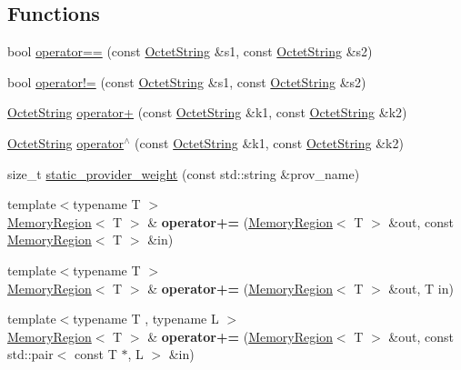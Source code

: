 \subsection*{Functions}
\begin{DoxyCompactItemize}
\item 
bool \hyperlink{namespaceBotan_ada334debcefe679cd86ea5515fdac333}{operator==} (const \hyperlink{classBotan_1_1OctetString}{Octet\-String} \&s1, const \hyperlink{classBotan_1_1OctetString}{Octet\-String} \&s2)
\item 
bool \hyperlink{namespaceBotan_a9ddf36ed7be5a5e216c0f14fd77ff1a6}{operator!=} (const \hyperlink{classBotan_1_1OctetString}{Octet\-String} \&s1, const \hyperlink{classBotan_1_1OctetString}{Octet\-String} \&s2)
\item 
\hyperlink{classBotan_1_1OctetString}{Octet\-String} \hyperlink{namespaceBotan_a41e34bf15722c5c4e07110340711e719}{operator+} (const \hyperlink{classBotan_1_1OctetString}{Octet\-String} \&k1, const \hyperlink{classBotan_1_1OctetString}{Octet\-String} \&k2)
\item 
\hyperlink{classBotan_1_1OctetString}{Octet\-String} \hyperlink{namespaceBotan_acae3b6bb409aed05ab658d9aa9a70b3e}{operator$^\wedge$} (const \hyperlink{classBotan_1_1OctetString}{Octet\-String} \&k1, const \hyperlink{classBotan_1_1OctetString}{Octet\-String} \&k2)
\item 
size\-\_\-t \hyperlink{namespaceBotan_afaf81ba31997b36ea0928e297e03ea47}{static\-\_\-provider\-\_\-weight} (const std\-::string \&prov\-\_\-name)
\item 
\hypertarget{namespaceBotan_a6eb7458a1c5c8ba5f37e7a145e3fa8d0}{{\footnotesize template$<$typename T $>$ }\\\hyperlink{classBotan_1_1MemoryRegion}{Memory\-Region}$<$ T $>$ \& {\bfseries operator+=} (\hyperlink{classBotan_1_1MemoryRegion}{Memory\-Region}$<$ T $>$ \&out, const \hyperlink{classBotan_1_1MemoryRegion}{Memory\-Region}$<$ T $>$ \&in)}\label{namespaceBotan_a6eb7458a1c5c8ba5f37e7a145e3fa8d0}

\item 
\hypertarget{namespaceBotan_a5f09c231a254046ad51ad80998842b83}{{\footnotesize template$<$typename T $>$ }\\\hyperlink{classBotan_1_1MemoryRegion}{Memory\-Region}$<$ T $>$ \& {\bfseries operator+=} (\hyperlink{classBotan_1_1MemoryRegion}{Memory\-Region}$<$ T $>$ \&out, T in)}\label{namespaceBotan_a5f09c231a254046ad51ad80998842b83}

\item 
\hypertarget{namespaceBotan_a7ab7e909c19cd037e662ce6cc1075595}{{\footnotesize template$<$typename T , typename L $>$ }\\\hyperlink{classBotan_1_1MemoryRegion}{Memory\-Region}$<$ T $>$ \& {\bfseries operator+=} (\hyperlink{classBotan_1_1MemoryRegion}{Memory\-Region}$<$ T $>$ \&out, const std\-::pair$<$ const T $\ast$, L $>$ \&in)}\label{namespaceBotan_a7ab7e909c19cd037e662ce6cc1075595}


\end{DoxyCompactItemize}
